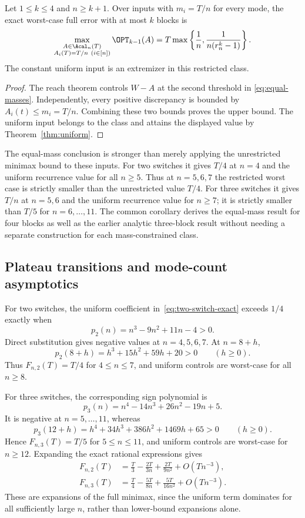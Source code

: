\begin{corollary}\label{cor:equal-masses}
Let $1\le k\le4$ and $n\ge k+1$. Over inputs with $m_i=T/n$ for every
mode, the exact worst-case full error with at most $k$ blocks is
\begin{equation}\label{eq:equal-masses}
 \max_{\substack{A\in\Acal_n(T)\\A_i(T)=T/n\ (i\in[n])}}
       \OPT_{k-1}(A)
 =T\max\left\{\frac1n,\frac1{n(r_n^k-1)}\right\}.
\end{equation}
The constant uniform input is an extremizer in this restricted class.
\end{corollary}
\begin{proof}
The reach theorem controls $W-A$ at the second threshold in
\eqref{eq:equal-masses}. Independently, every positive discrepancy is
bounded by $A_i(t)\le m_i=T/n$. Combining these two bounds proves the
upper bound. The uniform input belongs to the class and attains the
displayed value by Theorem~\ref{thm:uniform}.
\end{proof}

The equal-mass conclusion is stronger than merely applying the unrestricted
minimax bound to these inputs. For two switches it gives $T/4$ at $n=4$
and the uniform recurrence value for all $n\ge5$. Thus at $n=5,6,7$ the
restricted worst case is strictly smaller than the unrestricted value
$T/4$. For three switches it gives $T/n$ at $n=5,6$ and the uniform
recurrence value for $n\ge7$; it is strictly smaller than $T/5$ for
$n=6,\ldots,11$. The common corollary derives the equal-mass result for
four blocks as well as the earlier analytic three-block result without
needing a separate construction for each mass-constrained class.

\subsection{Plateau transitions and mode-count asymptotics}

For two switches, the uniform coefficient in~\eqref{eq:two-switch-exact}
exceeds $1/4$ exactly when
\[
 p_2(n)=n^3-9n^2+11n-4>0.
\]
Direct substitution gives negative values at $n=4,5,6,7$. At $n=8+h$,
\[
 p_2(8+h)=h^3+15h^2+59h+20>0\qquad(h\ge0).
\]
Thus $F_{n,2}(T)=T/4$ for $4\le n\le7$, and uniform controls are
worst-case for all $n\ge8$.

For three switches, the corresponding sign polynomial is
\[
 p_3(n)=n^4-14n^3+26n^2-19n+5.
\]
It is negative at $n=5,\ldots,11$, whereas
\[
 p_3(12+h)=h^4+34h^3+386h^2+1469h+65>0\qquad(h\ge0).
\]
Hence $F_{n,3}(T)=T/5$ for $5\le n\le11$, and uniform controls are
worst-case for $n\ge12$. Expanding the exact rational expressions gives
\begin{align}
 F_{n,2}(T)&=\frac T3-\frac{2T}{3n}+\frac{2T}{9n^2}
                      +O(Tn^{-3}),\label{eq:two-switch-expansion}\\
 F_{n,3}(T)&=\frac T4-\frac{5T}{8n}+\frac{5T}{16n^2}
                      +O(Tn^{-3}).\label{eq:three-switch-expansion}
\end{align}
These are expansions of the full minimax, since the uniform term dominates
for all sufficiently large $n$, rather than lower-bound expansions alone.


